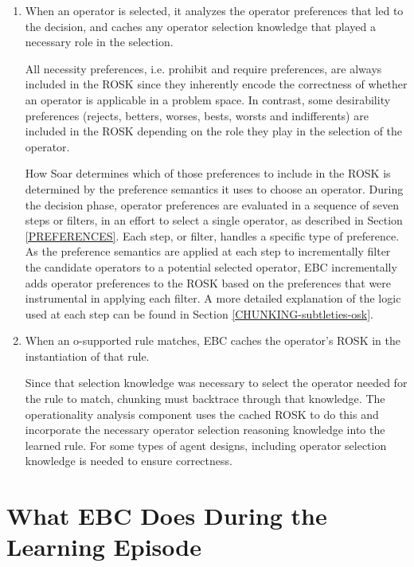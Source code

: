 \begin{enumerate}
	\item When an operator is selected, it analyzes the operator preferences that led to the decision, and caches any operator selection knowledge that played a necessary role in the selection. 

	All necessity preferences, i.e. prohibit and require preferences, are always included in the ROSK since they inherently encode the correctness of whether an operator is applicable in a problem space. In contrast, some desirability preferences (rejects, betters, worses, bests, worsts and indifferents) are included in the ROSK depending on the role they play in the selection of the operator. 

	How Soar determines which of those preferences to include in the ROSK is determined by the preference semantics it uses to choose an operator. During the decision phase, operator preferences are evaluated in a sequence of seven steps or filters, in an effort to select a single operator, as described in Section \ref{PREFERENCES}.  Each step, or filter, handles a specific type of preference.  As the preference semantics are applied at each step to incrementally filter the candidate operators to a potential selected operator, EBC incrementally adds operator preferences to the ROSK based on the preferences that were instrumental in applying each filter.  A more detailed explanation of the logic used at each step can be found in Section \ref{CHUNKING-subtleties-osk}.

	\item When an o-supported rule matches, EBC caches the operator's ROSK in the instantiation of that rule.  

	Since that selection knowledge was necessary to select the operator needed for the rule to match, chunking must backtrace through that knowledge.  The operationality analysis component uses the cached ROSK to do this and incorporate the necessary operator selection reasoning knowledge into the learned rule.  For some types of agent designs, including operator selection knowledge is needed to ensure correctness.
\end{enumerate}


\section{What EBC Does During the Learning Episode}
\label{CHUNKING-during}

